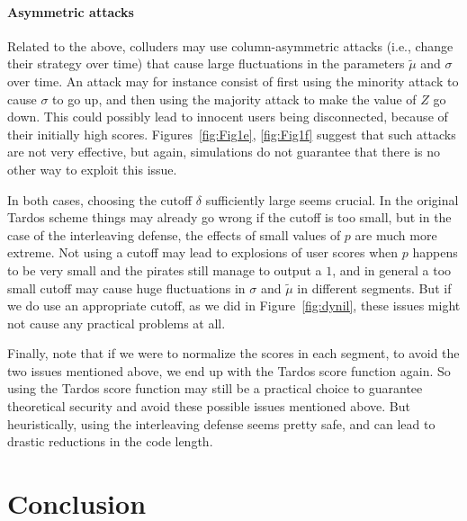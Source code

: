 \documentclass[10pt,a4paper,twocolumn]{article}
\begin{document}
\paragraph{Asymmetric attacks}
Related to the above, colluders may use column-asymmetric attacks (i.e., change their strategy over time) that cause large fluctuations in the parameters $\tilde{\mu}$ and $\sigma$ over time. An attack may for instance consist of first using the minority attack to cause $\sigma$ to go up, and then using the majority attack to make the value of $Z$ go down. This could possibly lead to innocent users being disconnected, because of their initially high scores. Figures~\ref{fig:Fig1e}, \ref{fig:Fig1f} suggest that such attacks are not very effective, but again, simulations do not guarantee that there is no other way to exploit this issue.

In both cases, choosing the cutoff $\delta$ sufficiently large seems crucial. In the original Tardos scheme things may already go wrong if the cutoff is too small, but in the case of the interleaving defense, the effects of small values of $p$ are much more extreme. Not using a cutoff may lead to explosions of user scores when $p$ happens to be very small and the pirates still manage to output a $1$, and in general a too small cutoff may cause huge fluctuations in $\sigma$ and $\tilde{\mu}$ in different segments. But if we do use an appropriate cutoff, as we did in Figure~\ref{fig:dynil}, these issues might not cause any practical problems at all.

Finally, note that if we were to normalize the scores in each segment, to avoid the two issues mentioned above, we end up with the Tardos score function again. So using the Tardos score function may still be a practical choice to guarantee theoretical security and avoid these possible issues mentioned above. But heuristically, using the interleaving defense seems pretty safe, and can lead to drastic reductions in the code length.





\section{Conclusion}
\label{sec:conclusion}
\end{document}
